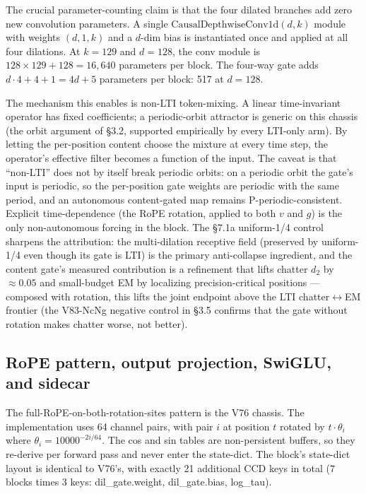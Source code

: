 \documentclass[11pt]{article}
\begin{document}
The crucial parameter-counting claim is that the four dilated branches add zero new convolution parameters. A single $\text{CausalDepthwiseConv1d}(d, k)$ module with weights $(d, 1, k)$ and a $d$-dim bias is instantiated once and applied at all four dilations. At $k=129$ and $d=128$, the conv module is $128 \times 129 + 128 = 16{,}640$ parameters per block. The four-way gate adds $d \cdot 4 + 4 + 1 = 4d + 5$ parameters per block: 517 at $d = 128$.

The mechanism this enables is non-LTI token-mixing. A linear time-invariant operator has fixed coefficients; a periodic-orbit attractor is generic on this chassis (the orbit argument of \S3.2, supported empirically by every LTI-only arm). By letting the per-position content choose the mixture at every time step, the operator's effective filter becomes a function of the input. The caveat is that ``non-LTI'' does not by itself break periodic orbits: on a periodic orbit the gate's input is periodic, so the per-position gate weights are periodic with the same period, and an autonomous content-gated map remains P-periodic-consistent. Explicit time-dependence (the RoPE rotation, applied to both $v$ and $g$) is the only non-autonomous forcing in the block. The \S7.1a uniform-1/4 control sharpens the attribution: the multi-dilation receptive field (preserved by uniform-1/4 even though its gate is LTI) is the primary anti-collapse ingredient, and the content gate's measured contribution is a refinement that lifts chatter $d_2$ by $\approx 0.05$ and small-budget EM by localizing precision-critical positions --- composed with rotation, this lifts the joint endpoint above the LTI chatter$\leftrightarrow$EM frontier (the V83-NcNg negative control in \S3.5 confirms that the gate without rotation makes chatter worse, not better).

\subsection{RoPE pattern, output projection, SwiGLU, and sidecar}

The full-RoPE-on-both-rotation-sites pattern is the V76 chassis. The implementation uses 64 channel pairs, with pair $i$ at position $t$ rotated by $t \cdot \theta_i$ where $\theta_i = 10000^{-2i/64}$. The cos and sin tables are non-persistent buffers, so they re-derive per forward pass and never enter the state-dict. The block's state-dict layout is identical to V76's, with exactly 21 additional CCD keys in total (7 blocks times 3 keys: dil\_gate.weight, dil\_gate.bias, log\_tau).
\end{document}
